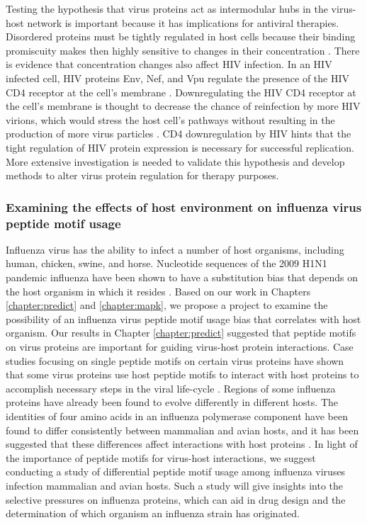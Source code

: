 Testing the hypothesis that virus proteins act as intermodular hubs in
the virus-host network is important because it has implications for
antiviral therapies. Disordered proteins must be tightly regulated in
host cells because their binding promiscuity makes then highly
sensitive to changes in their concentration
\cite{vavouri2009intrinsic,gsponer2008tight}. There is evidence that
concentration changes also affect HIV infection. In an HIV infected
cell, HIV proteins Env, Nef, and Vpu regulate the presence of the HIV
CD4 receptor at the cell's membrane
\cite{levesque2004role}. Downregulating the HIV CD4 receptor at the
cell's membrane is thought to decrease the chance of reinfection by
more HIV virions, which would stress the host cell's pathways without
resulting in the production of more virus particles
\cite{arold2001dynamic,harris1999hiv}. CD4 downregulation by HIV hints
that the tight regulation of HIV protein expression is necessary for
successful replication. More extensive investigation is needed to
validate this hypothesis and develop methods to alter virus protein
regulation for therapy purposes.

\subsubsection{Examining the effects of host environment on influenza virus peptide motif usage}

Influenza virus has the ability to infect a number of host organisms,
including human, chicken, swine, and horse. Nucleotide sequences of
the 2009 H1N1 pandemic influenza have been shown to have a substitution
bias that depends on the host organism in which it resides
\cite{solovyov2010host}. Based on our work in Chapters
\ref{chapter:predict} and \ref{chapter:mapk}, we propose a project to
examine the possibility of an influenza virus peptide motif usage bias
that correlates with host organism. Our results in Chapter
\ref{chapter:predict} suggested that peptide motifs on virus proteins
are important for guiding virus-host protein interactions. Case
studies focusing on single peptide motifs on certain virus proteins
have shown that some virus proteins use host peptide motifs to
interact with host proteins to accomplish necessary steps in the viral
life-cycle \cite{kadaveru08}. Regions of some influenza proteins have
already been found to evolve differently in different hosts. The
identities of four amino acids in an influenza polymerase component
have been found to differ consistently between mammalian and avian
hosts, and it has been suggested that these differences affect
interactions with host proteins \cite{yamada2010biological}. In light
of the importance of peptide motifs for virus-host interactions, we
suggest conducting a study of differential peptide motif usage among
influenza viruses infection mammalian and avian hosts. Such a study
will give insights into the selective pressures on influenza proteins,
which can aid in drug design and the determination of which organism
an influenza strain has originated.

